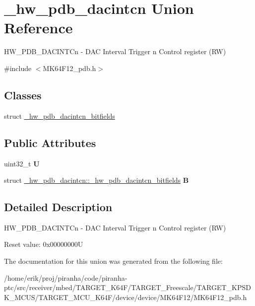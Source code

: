 \hypertarget{union__hw__pdb__dacintcn}{}\section{\+\_\+hw\+\_\+pdb\+\_\+dacintcn Union Reference}
\label{union__hw__pdb__dacintcn}


H\+W\+\_\+\+P\+D\+B\+\_\+\+D\+A\+C\+I\+N\+T\+Cn -\/ D\+AC Interval Trigger n Control register (RW)  




{\ttfamily \#include $<$M\+K64\+F12\+\_\+pdb.\+h$>$}

\subsection*{Classes}
\begin{DoxyCompactItemize}
\item 
struct \hyperlink{struct__hw__pdb__dacintcn_1_1__hw__pdb__dacintcn__bitfields}{\+\_\+hw\+\_\+pdb\+\_\+dacintcn\+\_\+bitfields}
\end{DoxyCompactItemize}
\subsection*{Public Attributes}
\begin{DoxyCompactItemize}
\item 
uint32\+\_\+t {\bfseries U}\hypertarget{union__hw__pdb__dacintcn_a4ce201d4460de9b4cc94e04f9905b2d1}{}\label{union__hw__pdb__dacintcn_a4ce201d4460de9b4cc94e04f9905b2d1}

\item 
struct \hyperlink{struct__hw__pdb__dacintcn_1_1__hw__pdb__dacintcn__bitfields}{\+\_\+hw\+\_\+pdb\+\_\+dacintcn\+::\+\_\+hw\+\_\+pdb\+\_\+dacintcn\+\_\+bitfields} {\bfseries B}\hypertarget{union__hw__pdb__dacintcn_a4775c65e01aad147a073f7a4fec0550a}{}\label{union__hw__pdb__dacintcn_a4775c65e01aad147a073f7a4fec0550a}

\end{DoxyCompactItemize}


\subsection{Detailed Description}
H\+W\+\_\+\+P\+D\+B\+\_\+\+D\+A\+C\+I\+N\+T\+Cn -\/ D\+AC Interval Trigger n Control register (RW) 

Reset value\+: 0x00000000U 

The documentation for this union was generated from the following file\+:\begin{DoxyCompactItemize}
\item 
/home/erik/proj/piranha/code/piranha-\/ptc/src/receiver/mbed/\+T\+A\+R\+G\+E\+T\+\_\+\+K64\+F/\+T\+A\+R\+G\+E\+T\+\_\+\+Freescale/\+T\+A\+R\+G\+E\+T\+\_\+\+K\+P\+S\+D\+K\+\_\+\+M\+C\+U\+S/\+T\+A\+R\+G\+E\+T\+\_\+\+M\+C\+U\+\_\+\+K64\+F/device/device/\+M\+K64\+F12/M\+K64\+F12\+\_\+pdb.\+h\end{DoxyCompactItemize}
